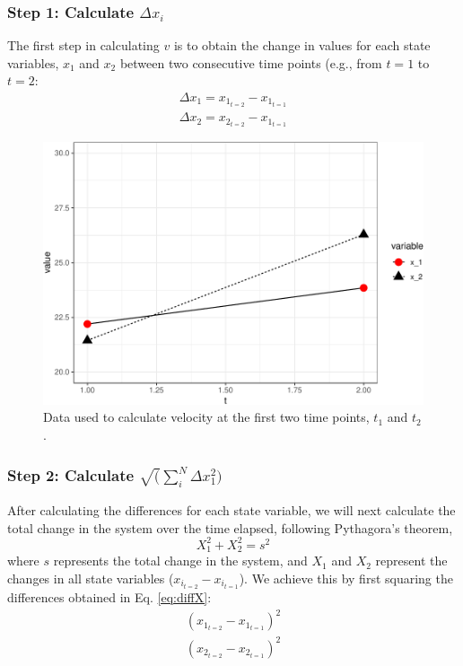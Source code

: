 \documentclass[12pt,twoside,openany]{reedthesis}
\begin{document}
\subsubsection{\texorpdfstring{Step 1: Calculate
\(\Delta x_i\)}{Step 1: Calculate \textbackslash{}Delta x\_i}}\label{step-1-calculate-delta-x_i}

The first step in calculating \(v\) is to obtain the change in values
for each state variables, \(x_1\) and \(x_2\) between two consecutive
time points (e.g., from \(t=1\) to \(t=2\):
\begin{equation}
\begin{array}{rcr}
\Delta x_1 = x_{1_{t=2}} - x_{1_{t=1}} \\
\Delta x_2 = x_{2_{t=2}} - x_{1_{t=1}}
  \end{array}
\label{eq:diffX}
\end{equation}
\begin{figure}
\centering
\includegraphics{_myDissertation_files/figure-latex/sysEx2-1.pdf}
\caption{\label{fig:sysEx2}Data used to calculate velocity at the first two
time points, \(t_1\) and \(t_2\).}
\end{figure}
\subsubsection{\texorpdfstring{Step 2: Calculate
\(\sqrt(\sum_i^N\Delta x_1^2)\)}{Step 2: Calculate \textbackslash{}sqrt(\textbackslash{}sum\_i\^{}N\textbackslash{}Delta x\_1\^{}2)}}\label{step-2-calculate-sqrtsum_indelta-x_12}

After calculating the differences for each state variable, we will next
calculate the total change in the system over the time elapsed,
following Pythagora's theorem,
\begin{equation}
 X_1^2 + X_2^2 = s^2 
  \label{eq:pythagorean}
\end{equation}
where \(s\) represents the total change in the system, and \(X_1\) and
\(X_2\) represent the changes in all state variables
(\(x_{i_{t=2}} - x_{i_{t=1}}\)). We achieve this by first squaring the
differences obtained in Eq. \eqref{eq:diffX}:
\begin{equation}
\begin{array}{rcr}
(x_{1_{t=2}} - x_{1_{t=1}})^2  \\
(x_{2_{t=2}} - x_{2_{t=1}})^2 
\end{array}
  \label{eq:diffXsq}
\end{equation}
\end{document}
